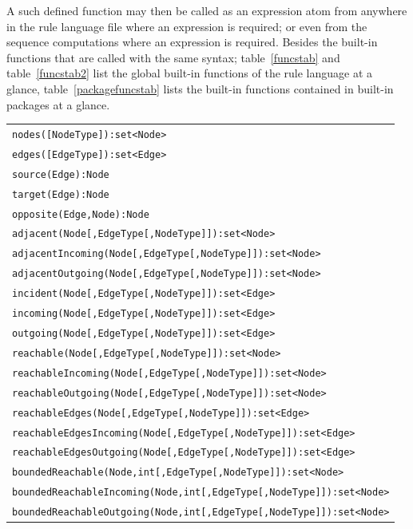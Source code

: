 A such defined function may then be called as an expression atom from anywhere in the rule language file where an expression is required; or even from the sequence computations where an expression is required.
Besides the built-in functions that are called with the same syntax;
table~\ref{funcstab} and table~\ref{funcstab2} list the global built-in functions of the rule language at a glance,
table~\ref{packagefuncstab} lists the built-in functions contained in built-in packages at a glance.

\begin{table}[htbp]
\centering
\begin{tabular}{|l|}
\hline
\texttt{nodes([NodeType]):set<Node>}\\
\texttt{edges([EdgeType]):set<Edge>}\\
\hline
\texttt{source(Edge):Node}\\
\texttt{target(Edge):Node}\\
\texttt{opposite(Edge,Node):Node}\\
\hline
\texttt{adjacent(Node[,EdgeType[,NodeType]]):set<Node>}\\
\texttt{adjacentIncoming(Node[,EdgeType[,NodeType]]):set<Node>}\\
\texttt{adjacentOutgoing(Node[,EdgeType[,NodeType]]):set<Node>}\\
\texttt{incident(Node[,EdgeType[,NodeType]]):set<Edge>}\\
\texttt{incoming(Node[,EdgeType[,NodeType]]):set<Edge>}\\
\texttt{outgoing(Node[,EdgeType[,NodeType]]):set<Edge>}\\
\hline
\texttt{reachable(Node[,EdgeType[,NodeType]]):set<Node>}\\
\texttt{reachableIncoming(Node[,EdgeType[,NodeType]]):set<Node>}\\
\texttt{reachableOutgoing(Node[,EdgeType[,NodeType]]):set<Node>}\\
\texttt{reachableEdges(Node[,EdgeType[,NodeType]]):set<Edge>}\\
\texttt{reachableEdgesIncoming(Node[,EdgeType[,NodeType]]):set<Edge>}\\
\texttt{reachableEdgesOutgoing(Node[,EdgeType[,NodeType]]):set<Edge>}\\
\hline
\texttt{boundedReachable(Node,int[,EdgeType[,NodeType]]):set<Node>}\\
\texttt{boundedReachableIncoming(Node,int[,EdgeType[,NodeType]]):set<Node>}\\
\texttt{boundedReachableOutgoing(Node,int[,EdgeType[,NodeType]]):set<Node>}\\

\end{tabular}
\end{table}
